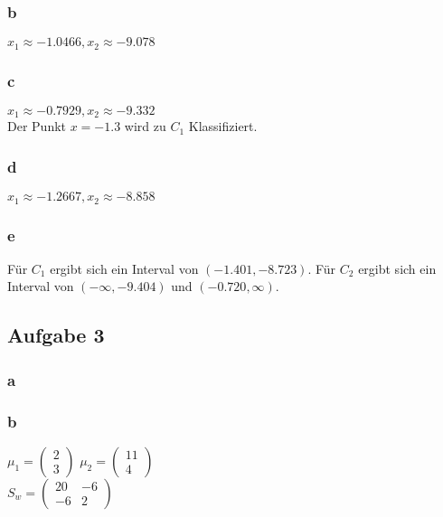 \documentclass{article}
\begin{document}
	\subsubsection{b}
	$x_1 \approx -1.0466 , x_2 \approx -9.078$
	
	\subsubsection{c}
	$x_1 \approx -0.7929 , x_2 \approx -9.332$
	\\ Der Punkt $x=-1.3$ wird zu $C_1$ Klassifiziert.
	\subsubsection{d}
	$x_1 \approx -1.2667 , x_2 \approx -8.858$
	
	\subsubsection{e}
	Für $C_1$ ergibt sich ein Interval von $(-1.401 , -8.723)$.
	Für $C_2$ ergibt sich ein Interval von $(-\infty, -9.404) $ und $(-0.720, \infty)$.
	
\subsection{Aufgabe 3}
	\subsubsection{a}

		\begin{figure}[h]
		\end{figure}
		
		\subsubsection{b}
		
		$\mu_{1} = 
		\begin{pmatrix}
			2\\
			3	
		\end{pmatrix}$
		$\mu_{2} = 
		\begin{pmatrix}
			11\\
			4
		\end{pmatrix}$
		\\
		$S_w = 
		\begin{pmatrix}
		20 & -6\\
		-6 & 2
		\end{pmatrix}$
		
\end{document}
